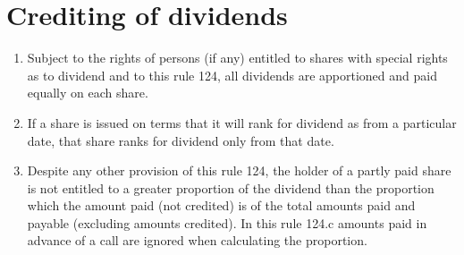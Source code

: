 \section{Crediting of dividends}

\begin{enumerate}[label=(\alph*)]
    \item Subject to the rights of persons (if any) entitled to shares with special rights as to dividend and to this rule 124, all dividends are apportioned and paid equally on each share.
    
    \item If a share is issued on terms that it will rank for dividend as from a particular date, that share ranks for dividend only from that date.
    
    \item Despite any other provision of this rule 124, the holder of a partly paid share is not entitled to a greater proportion of the dividend than the proportion which the amount paid (not credited) is of the total amounts paid and payable (excluding amounts credited). In this rule 124.c amounts paid in advance of a call are ignored when calculating the proportion.
\end{enumerate} 